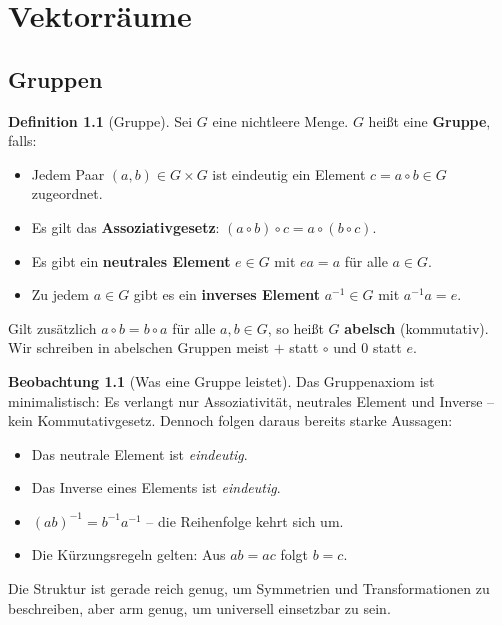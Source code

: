 ﻿\documentclass[a4paper,12pt]{report}
\theoremstyle{definition}
\newtheorem{definition}{Definition}
\newtheorem{beobachtung}{Beobachtung}
\begin{document}
\chapter{Vektorräume}

\section{Gruppen}

\begin{definition}[Gruppe]
    Sei $G$ eine nichtleere Menge. $G$ heißt eine \textbf{Gruppe}, falls:
    \begin{itemize}
        \item[-] Jedem Paar $(a, b) \in G \times G$ ist eindeutig ein Element
              $c = a \circ b \in G$ zugeordnet.
        \item[-] Es gilt das \textbf{Assoziativgesetz}:
              $(a \circ b) \circ c = a \circ (b \circ c)$.
        \item[-] Es gibt ein \textbf{neutrales Element} $e \in G$ mit $ea = a$
              für alle $a \in G$.
        \item[-] Zu jedem $a \in G$ gibt es ein \textbf{inverses Element}
              $a^{-1} \in G$ mit $a^{-1} a = e$.
    \end{itemize}
    Gilt zusätzlich $a \circ b = b \circ a$ für alle $a, b \in G$, so heißt
    $G$ \textbf{abelsch} (kommutativ). Wir schreiben in abelschen Gruppen meist
    $+$ statt $\circ$ und $0$ statt $e$.
\end{definition}

\begin{beobachtung}[Was eine Gruppe leistet]
    Das Gruppenaxiom ist minimalistisch: Es verlangt nur Assoziativität,
    neutrales Element und Inverse -- kein Kommutativgesetz. Dennoch folgen
    daraus bereits starke Aussagen:
    \begin{itemize}
        \item[-] Das neutrale Element ist \emph{eindeutig}.
        \item[-] Das Inverse eines Elements ist \emph{eindeutig}.
        \item[-] $(ab)^{-1} = b^{-1} a^{-1}$ -- die Reihenfolge kehrt sich um.
        \item[-] Die Kürzungsregeln gelten: Aus $ab = ac$ folgt $b = c$.
    \end{itemize}
    Die Struktur ist gerade reich genug, um Symmetrien und Transformationen
    zu beschreiben, aber arm genug, um universell einsetzbar zu sein.
\end{beobachtung}
\end{document}
